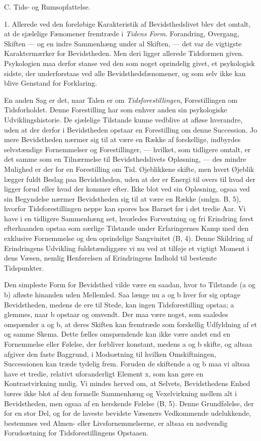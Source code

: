 \documentclass[12pt,a4paper,openany]{book}
\newcommand{\opage}[1]{\marginnote{\footnotesize\textit{[#1]}}}
\begin{document}
\begin{center}C. Tids- og Rumsopfattelse.\end{center}

1. Allerede ved den foreløbige Karakteristik af Bevidsthedslivet blev
det omtalt, at de sjælelige Fænomener fremtræde
\opage{227}i \emph{Tidens Form}. Forandring, Overgang, Skiften --- og en
indre Sammenhæng under al Skiften, --- det var de vigtigste
Karaktermærker for Bevidstheden. Men deri ligger allerede Tidsformen
given. Psykologien maa derfor stanse ved den som noget oprindelig givet,
et psykologisk sidste, der underforstaas ved alle Bevidsthedsfænomener,
og som selv ikke kan blive Genstand for Forklaring.

En anden Sag er det, naar Talen er om \emph{Tidsforestillingen},
Forestillingen om Tidsforholdet. Denne Forestilling har som enhver anden
sin psykologiske Udviklingshistorie. De sjælelige Tilstande kunne
vedblive at afløse hverandre, uden at der derfor i Bevidstheden opstaar
en Forestilling om denne Succession. Jo mere Bevidstheden nærmer sig til
at være en Række af forskellige, indbyrdes selvstændige Fornemmelser og
Forestillinger, --- hvilket, som tidligere omtalt, er det samme som en
Tilnærmelse til Bevidsthedslivets Opløsning, --- des mindre Mulighed er
der for en Forestilling om Tid. Øjeblikkene skifte, men hvert Øjeblik
lægger fuldt Beslag paa Bevidstheden, uden at der er Energi til overs
til hvad der ligger forud eller hvad der kommer efter. Ikke blot ved sin
Opløsning, ogsaa ved sin Begyndelse nærmer Bevidstheden sig til at være
en Række (smlgn. B, 5), hvorfor Tidsforestillingen neppe kan spores hos
Barnet før i det tredie Aar. Vi have i en tidligere Sammenhæng set,
hvorledes Forventning og fri Erindring først efterhaanden opstaa som
særlige Tilstande under Erfaringernes Kamp med den exklusive Fornemmelse
og den oprindelige Sangvinitet (B, 4). Denne Skildring af Erindringens
Udvikling fuldstændiggøre vi nu ved at tilføje et vigtigt Moment i dens
Væsen, nemlig Henførelsen af Erindringens Indhold til bestemte
Tidspunkter.

Den simpleste Form for Bevidsthed vilde være en saadan, hvor to
Tilstande (a og b) afløste hinanden uden Mellemled. Saa længe nu a og b
hver for sig optage Bevidstheden, medens de ere til Stede, kan ingen
Tidsforestilling opstaa; a glemmes, naar b opstaar og omvendt. Der maa
være noget, som saaledes omspænder a og b, at deres Skiften kan
fremtræde som forskellig Udfyldning af et og samme Skema. Dette fælles
omspændende kan ikke være andet end en Fornemmelse eller Følelse, der
forbliver konstant, medens a og b skifte, og altsaa
\opage{228}afgiver den faste Baggrund, i Modsætning til hvilken
Omskiftningen, Successionen kan træde tydelig frem. Foruden de skiftende
a og b maa vi altsaa have et tredie, relativt uforanderligt Element x,
som kan gøre en Kontrastvirkning mulig. Vi mindes herved om, at Selvets,
Bevidsthedens Enhed bæres ikke blot af den formelle Sammenhæng og
Vexelvirkning mellem alt i Bevidstheden, men ogsaa af en herskende
Følelse (B, 5). Denne Grundfølelse, der for en stor Del, og for de
laveste bevidste Væseners Vedkommende udelukkende, bestemmes ved Almen-
eller Livsfornemmelserne, er altsaa en nødvendig Forudsætning for
Tidsforestillingens Opstaaen.
\end{document}
